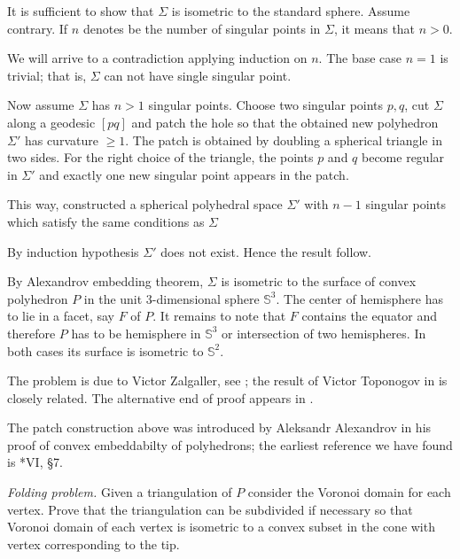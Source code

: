 It is sufficient to show that $\Sigma$ is isometric to the standard sphere.
Assume contrary.
If $n$ denotes be the number of singular points in $\Sigma$, 
it means that $n>0$.

We will arrive to a contradiction applying induction on $n$.
The base case $n=1$ is trivial; 
that is, $\Sigma$ can not have single singular point.

Now assume $\Sigma$ has $n>1$ singular points.
Choose two singular points $p, q$,
cut $\Sigma$ along a geodesic $[pq]$
and patch the hole so that the obtained new polyhedron $\Sigma'$ has curvature $\ge 1$.
The patch is obtained by doubling a
spherical triangle in two sides.
For the right choice of the triangle,
the points $p$ and $q$ become regular in $\Sigma'$
and exactly one new singular point appears in the patch.

This way, constructed a  spherical polyhedral space $\Sigma'$
with $n-1$ singular points which satisfy the same conditions as $\Sigma$ 

By induction hypothesis $\Sigma'$ does not exist. Hence the result follow.

By Alexandrov embedding theorem, $\Sigma$ is isometric to the surface of convex polyhedron $P$ in the unit 3-dimensional sphere $\mathbb S^3$. 
The center of hemisphere has to lie in a facet, say $F$ of $P$.
It remains to note that $F$ contains the equator and therefore $P$ has to be hemisphere in $\mathbb S^3$ or intersection of two hemispheres.
In both cases its surface is isometric to $\mathbb S^2$.

The problem is due to Victor Zalgaller, 
see \cite{zalgaller-shperical-polygon};
the result of Victor Toponogov in \cite{toponogov} is closely related.
The alternative end of proof appears in \cite{panov-petrunin}.

The patch construction above was introduced by 
Aleksandr Alexandrov
in his proof of convex embeddabilty of polyhedrons;
the earliest reference we have found is
\cite{alexandrov1948}*{VI, \S7}.




\textit{Folding problem.}
Given a triangulation of $P$
consider the Voronoi domain for each vertex.
Prove that the triangulation can be subdivided if necessary
so that Voronoi domain of each vertex is isometric to a convex subset in the cone with vertex corresponding to the tip.

